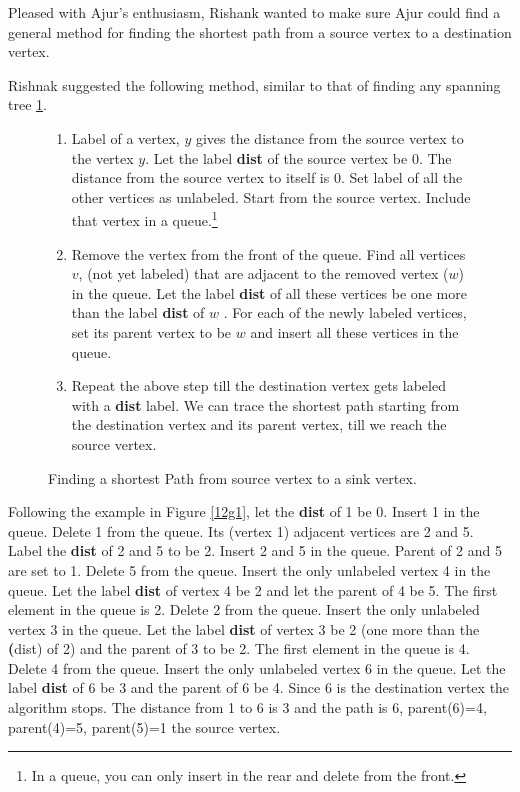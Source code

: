 Pleased with Ajur's enthusiasm, Rishank wanted to make sure Ajur could find a general method for finding the shortest path from a source vertex to a destination vertex.

Rishnak suggested the following method, similar to that of finding any spanning tree \ref{12a1}.

\begin{figure} 
\begin{enumerate}
\item  Label of a vertex, $y$ gives the distance from the source vertex to the vertex $y$.  Let the label \textbf{dist} of the source vertex be 0. The distance from the source vertex to itself is 0. Set label of all the other vertices as unlabeled. Start from the source vertex. Include that vertex in a queue.\footnote{ In a queue, you can only insert in the rear and delete from the front.} 
\item Remove the vertex from the front of the queue. Find all vertices $v$, (not yet labeled) that are adjacent to the removed vertex ($w$) in the queue. Let the label \textbf{dist} of all these vertices be one more than the label \textbf{dist} of $w$ . For each of the newly labeled vertices, set its parent vertex to be $w$ and insert all these vertices in the queue.
\item Repeat the above step till the destination vertex gets labeled with a \textbf{dist} label. We can trace the shortest path starting from the destination vertex and its parent vertex, till we reach the source vertex.
\end{enumerate}
\caption{Finding a shortest Path from source vertex to a sink vertex.}\label{12a1}
\end{figure}

Following the example in Figure \ref{12g1}, let the \textbf{dist} of 1 be 0. Insert 1 in the queue. Delete 1 from the queue. Its (vertex 1) adjacent vertices are 2 and 5. Label the \textbf{dist} of 2 and 5 to be 2. Insert 2 and 5 in the queue. Parent of 2 and 5 are set  to 1. Delete 5 from the queue. Insert the only unlabeled vertex 4 in the queue. Let the label \textbf{dist} of vertex 4 be 2 and let the parent of 4 be 5. The first element in the queue is 2. Delete 2 from the queue. Insert the only unlabeled vertex 3 in the queue.  Let the label \textbf{dist} of vertex 3 be 2 (one more than the \textbf(dist) of 2) and the parent of 3 to be 2. The first element in the queue is 4. Delete 4 from the queue. Insert the only unlabeled vertex 6 in the queue. Let the label \textbf{dist} of 6 be 3 and the parent of 6 be 4. Since 6 is the destination vertex the algorithm stops. The distance from 1 to 6 is 3 and the path is 6, parent(6)=4, parent(4)=5, parent(5)=1 the source vertex.

